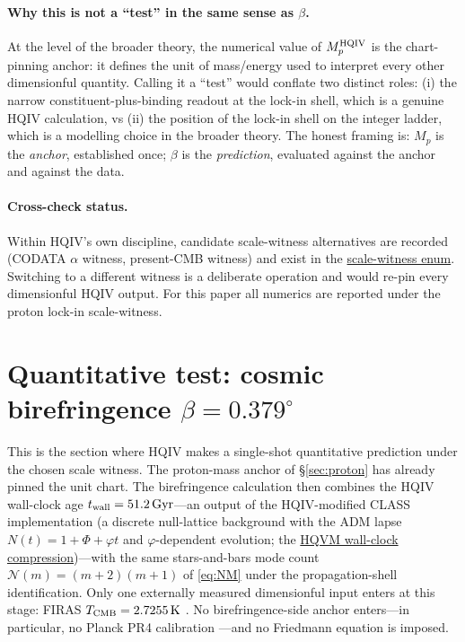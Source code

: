\documentclass[11pt]{amsart}
\begin{document}
\paragraph{Why this is not a ``test'' in the same sense as $\beta$.}
At the level of the broader theory, the numerical value of
$M_p^{\rm HQIV}$ is the chart-pinning anchor: it defines the unit
of mass/energy used to interpret every other dimensionful
quantity.  Calling it a ``test'' would conflate two distinct
roles: (i) the narrow constituent-plus-binding readout at the
lock-in shell, which is a genuine HQIV calculation, vs (ii) the
position of the lock-in shell on the integer ladder, which is a
modelling choice in the broader theory.  The honest framing is:
$M_p$ is the \emph{anchor}, established once;
$\beta$ is the \emph{prediction}, evaluated against the anchor
and against the data.

\paragraph{Cross-check status.}  Within HQIV's own discipline,
candidate scale-witness alternatives are recorded
(CODATA $\alpha$ witness, present-CMB witness) and exist in the
\hyperref[lean:scale-witness]{scale-witness enum}.  Switching to a
different witness is a deliberate operation and would re-pin every
dimensionful HQIV output.  For this paper all numerics are
reported under the proton lock-in scale-witness.

\section{Quantitative test: cosmic birefringence $\beta=0.379^\circ$}\label{sec:beta}

This is the section where HQIV makes a single-shot quantitative
prediction under the chosen scale witness.  The proton-mass
anchor of \S\ref{sec:proton} has already pinned the unit chart.
The birefringence calculation then combines the HQIV wall-clock
age $t_{\rm wall}=51.2\,\mathrm{Gyr}$---an output of the
HQIV-modified CLASS implementation (a discrete null-lattice
background with the ADM lapse $N(t)=1+\Phi+\varphi t$ and
$\varphi$-dependent evolution; the
\hyperref[lean:wall-clock]{HQVM wall-clock compression})---with
the same stars-and-bars mode count $\mathcal{N}(m)=(m+2)(m+1)$ of
\eqref{eq:NM} under the propagation-shell identification.  Only
one externally measured dimensionful input enters at this stage:
FIRAS $T_{\rm CMB}=2.7255\,\mathrm{K}$ \cite{fixsen2009}.  No
birefringence-side anchor enters---in particular, no Planck PR4
calibration \cite{planckPR42020}---and no Friedmann equation is
imposed.
\end{document}
